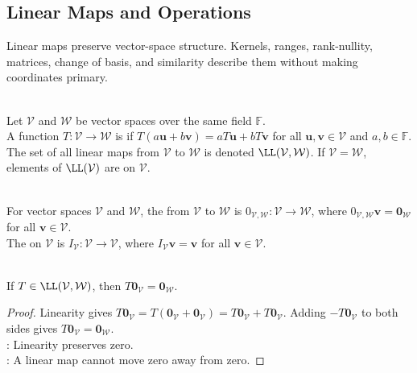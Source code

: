 \subsection{Linear Maps and Operations}
%

Linear maps preserve vector-space structure. Kernels, ranges, rank-nullity, matrices, change of basis, and similarity describe them without making coordinates primary.

\begin{definition} \label{def:linear-map} \\
Let $\mathcal{V}$ and $\mathcal{W}$ be vector spaces over the same field $\mathbb{F}$.\\
A function $T:\mathcal{V}\to\mathcal{W}$ is  if $T(a\mathbf{u}+b\mathbf{v})=aT\mathbf{u}+bT\mathbf{v}$ for all $\mathbf{u},\mathbf{v}\in\mathcal{V}$ and $a,b\in\mathbb{F}$.\\
The set of all linear maps from $\mathcal{V}$ to $\mathcal{W}$ is denoted $\LL(\mathcal{V},\mathcal{W})$. If $\mathcal{V}=\mathcal{W}$, elements of $\LL(\mathcal{V})$ are  on $\mathcal{V}$.
\end{definition}

\begin{definition} \\
For vector spaces $\mathcal{V}$ and $\mathcal{W}$, the  from $\mathcal{V}$ to $\mathcal{W}$ is $0_{\mathcal{V},\mathcal{W}}:\mathcal{V}\to\mathcal{W}$, where $0_{\mathcal{V},\mathcal{W}}\mathbf{v}=\mathbf{0}_{\mathcal{W}}$ for all $\mathbf{v}\in\mathcal{V}$.\\
The  on $\mathcal{V}$ is $I_{\mathcal{V}}:\mathcal{V}\to\mathcal{V}$, where $I_{\mathcal{V}}\mathbf{v}=\mathbf{v}$ for all $\mathbf{v}\in\mathcal{V}$.
\end{definition}

\begin{proposition} \label{prop:linear-maps-send-zero-to-zero} \\
If $T\in\LL(\mathcal{V},\mathcal{W})$, then $T\mathbf{0}_{\mathcal{V}}=\mathbf{0}_{\mathcal{W}}$.
\begin{proof}
Linearity gives $T\mathbf{0}_{\mathcal{V}}=T(\mathbf{0}_{\mathcal{V}}+\mathbf{0}_{\mathcal{V}})=T\mathbf{0}_{\mathcal{V}}+T\mathbf{0}_{\mathcal{V}}$. Adding $-T\mathbf{0}_{\mathcal{V}}$ to both sides gives $T\mathbf{0}_{\mathcal{V}}=\mathbf{0}_{\mathcal{W}}$.\\
: Linearity preserves zero.\\
: A linear map cannot move zero away from zero.
\end{proof}
\end{proposition}

